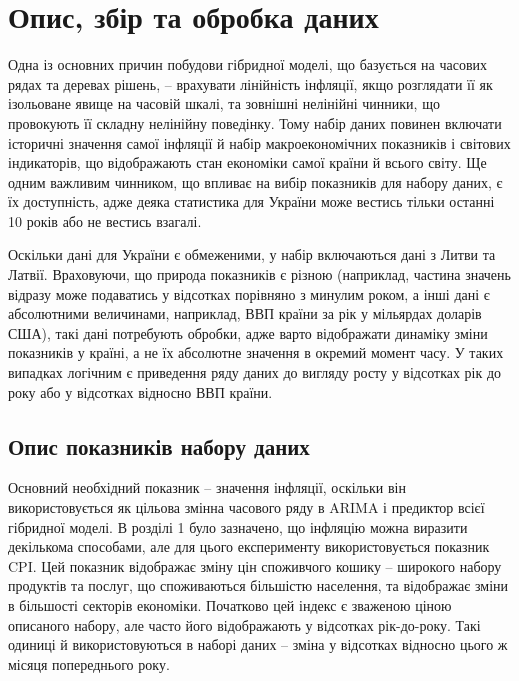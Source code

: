 \documentclass{bachelor_thesis}
\begin{document}
\section{Опис, збір та обробка даних}

Одна із основних причин побудови гібридної моделі, що базується на часових рядах та деревах рішень, -- врахувати лінійність інфляції, якщо розглядати її як ізольоване явище на часовій шкалі, та зовнішні нелінійні чинники, що провокують її складну нелінійну поведінку. Тому набір даних повинен включати історичні значення самої інфляції й набір макроекономічних показників і світових індикаторів, що відображають стан економіки самої країни й всього світу. Ще одним важливим чинником, що впливає на вибір показників для набору даних, є їх доступність, адже деяка статистика для України може вестись тільки останні 10 років або не вестись взагалі.

Оскільки дані для України є обмеженими, у набір включаються дані з Литви та Латвії. Враховуючи, що природа показників є різною (наприклад, частина значень відразу може подаватись у відсотках порівняно з минулим роком, а інші дані є абсолютними величинами, наприклад, ВВП країни за рік у мільярдах доларів США), такі дані потребують обробки, адже варто відображати динаміку зміни показників у країні, а не їх абсолютне значення в окремий момент часу. У таких випадках логічним є приведення ряду даних до вигляду росту у відсотках рік до року або у відсотках відносно ВВП країни.

\subsection{Опис показників набору даних}

Основний необхідний показник -- значення інфляції, оскільки він використовується як цільова змінна часового ряду в ARIMA і предиктор всієї гібридної моделі. В розділі 1 було зазначено, що інфляцію можна виразити декількома способами, але для цього експерименту використовується показник CPI. Цей показник відображає зміну цін споживчого кошику -- широкого набору продуктів та послуг, що споживаються більшістю населення, та відображає зміни в більшості секторів економіки. Початково цей індекс є зваженою ціною описаного набору, але часто його відображають у відсотках рік-до-року. Такі одиниці й використовуються в наборі даних -- зміна у відсотках відносно цього ж місяця попереднього року.
\end{document}
